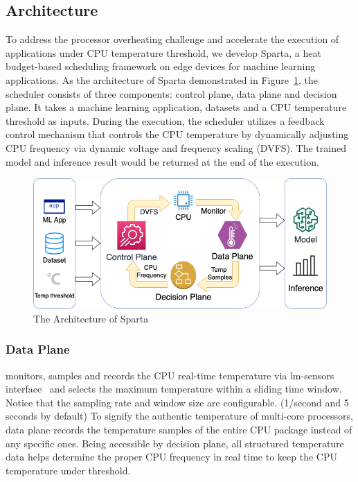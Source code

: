 \subsection{Architecture}

To address the processor overheating challenge and accelerate the execution of applications under CPU temperature threshold, we develop Sparta, a heat budget-based scheduling framework on edge devices for machine learning applications. As the architecture of Sparta demonstrated in Figure~\ref{fig:sparta}, the scheduler consists of three components: control plane, data plane and decision plane. It takes a machine learning application, datasets and a CPU temperature threshold as inputs. During the execution, the scheduler utilizes a feedback control mechanism that controls the CPU temperature by dynamically adjusting CPU frequency via dynamic voltage and frequency scaling (DVFS). The trained model and inference result would be returned at the end of the execution. 

\begin{figure}
\includegraphics[width=\textwidth]{figures/Sparta.png}
\caption{The Architecture of Sparta} \label{fig:sparta}
\end{figure}

\subsubsection{Data Plane}
monitors, samples and records the CPU real-time temperature via lm-sensors interface~\cite{ref:sensors} and selects the maximum temperature within a sliding time window. Notice that the sampling rate and window size are configurable. (1/second and 5 seconds by default) To signify the authentic temperature of multi-core processors, data plane records the temperature samples of the entire CPU package instead of any specific ones. Being accessible by decision plane, all structured temperature data helps determine the proper CPU frequency in real time to keep the CPU temperature under threshold.

